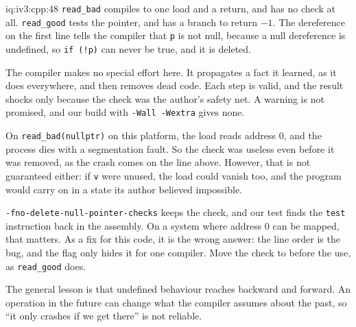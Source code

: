 \begin{solution}{iq:iv3:cpp:48}
\texttt{read\_bad} compiles to one load and a return, and has no check at all. \texttt{read\_good} tests the pointer, and has a branch to return $-1$. The dereference on the first line tells the compiler that \texttt{p} is not null, because a null dereference is undefined, so \texttt{if (!p)} can never be true, and it is deleted.

The compiler makes no special effort here. It propagates a fact it learned, as it does everywhere, and then removes dead code. Each step is valid, and the result shocks only because the check was the author's safety net. A warning is not promised, and our build with \texttt{-Wall -Wextra} gives none.

On \texttt{read\_bad(nullptr)} on this platform, the load reads address 0, and the process dies with a segmentation fault. So the check was useless even before it was removed, as the crash comes on the line above. However, that is not guaranteed either: if \texttt{v} were unused, the load could vanish too, and the program would carry on in a state its author believed impossible.

\texttt{-fno-delete-null-pointer-checks} keeps the check, and our test finds the \texttt{test} instruction back in the assembly. On a system where address 0 can be mapped, that matters. As a fix for this code, it is the wrong answer: the line order is the bug, and the flag only hides it for one compiler. Move the check to before the use, as \texttt{read\_good} does.

The general lesson is that undefined behaviour reaches backward and forward. An operation in the future can change what the compiler assumes about the past, so ``it only crashes if we get there'' is not reliable.

\end{solution}

